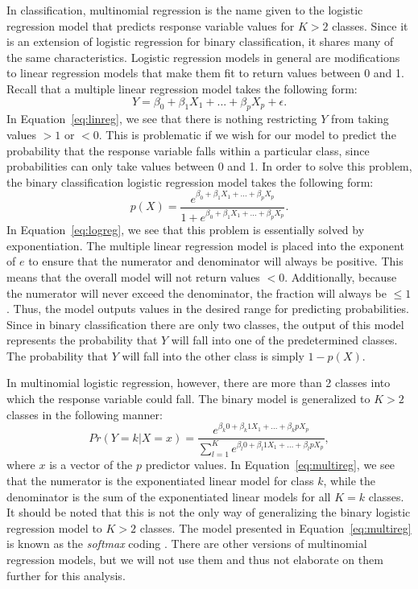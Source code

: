 \documentclass[12pt]{article}
\begin{document}
In classification, multinomial regression is the name given to the 
logistic regression model that predicts response variable values 
for $K > 2$ classes.  Since it is an extension of logistic regression 
for binary classification, it shares many of the same characteristics.  
Logistic regression models in general are modifications to linear 
regression models that make them fit to return values between 0 and 1.  
Recall that a multiple linear regression model takes the following form:
\begin{equation}
  \label{eq:linreg}
  Y = \beta_0 + \beta_1X_1 + ... + \beta_pX_p + \epsilon.
\end{equation}
In Equation~\eqref{eq:linreg}, we see that there is nothing restricting 
$Y$ from taking values $> 1$ or $< 0$.  This is problematic if we wish 
for our model to predict the probability that the response variable 
falls within a particular class, since probabilities can only take values 
between 0 and 1.  In order to solve this problem, the binary classification 
logistic regression model takes the following form:
\begin{equation}
  \label{eq:logreg}
  p(X) = 
  \frac{e ^ {\beta_0 + \beta_1X_1 + ... + \beta_pX_p}} 
  {1 + e ^ {\beta_0 + \beta_1X_1 + ... + \beta_pX_p}}.
\end{equation}
In Equation~\eqref{eq:logreg}, we see that this problem is essentially 
solved by exponentiation.  The multiple linear regression model is placed 
into the exponent of $e$ to ensure that the numerator and denominator will 
always be positive.  This means that the overall model will not return values 
$< 0$.  Additionally, because the numerator will never exceed the denominator, 
the fraction will always be $\leq 1$.  Thus, the model outputs values in the 
desired range for predicting probabilities.  Since in binary classification 
there are only two classes, the output of this model represents the probability 
that $Y$ will fall into one of the predetermined classes.  The probability that 
$Y$ will fall into the other class is simply $1 - p(X)$.

 In multinomial logistic regression, however, there are more than 2 classes 
 into which the response variable could fall.  The binary model is generalized 
 to $K > 2$ classes in the following manner:
 \begin{equation}
  \label{eq:multireg}
  Pr( Y = k | X = x ) = 
  \frac{e ^ {\beta_k0 + \beta_k1X_1 + ... + \beta_kpX_p}}
  { \sum_{l = 1} ^ {K}  e ^ {\beta_l0 + \beta_l1X_1 + ... + \beta_lpX_p}},
\end{equation}
where $x$ is a vector of the $p$ predictor values.  In 
Equation~\eqref{eq:multireg}, we see that the numerator is the exponentiated 
linear model for class $k$, while the denominator is the sum of the exponentiated 
linear models for all $K = k$ classes.  It should be noted that this is not the 
only way of generalizing the binary logistic regression model to $K >2$ classes.  
The model presented in Equation~\eqref{eq:multireg} is known as the \textit{softmax} 
coding \citep{james2021introduction}.  There are other versions of multinomial 
regression models, but we will not use them and thus not elaborate on them further 
for this analysis.  
\end{document}

